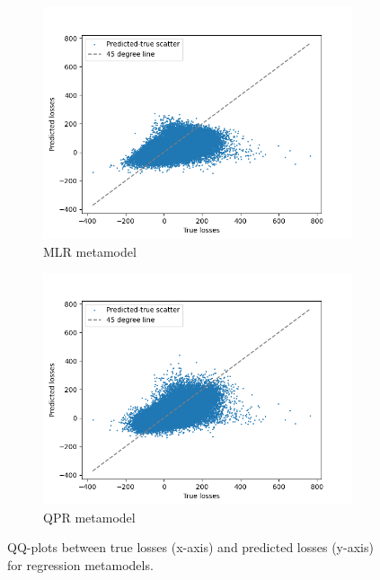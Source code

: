 \begin{figure}[ht!]
    \centering
    \begin{subfigure}{0.48\textwidth}
        \includegraphics[width=\textwidth]{./project2/figures/qqPlots/mlrLN.png}
        \caption{MLR metamodel}
    \end{subfigure}\hfill
    \begin{subfigure}{0.48\textwidth}
        \includegraphics[width=\textwidth]{./project2/figures/qqPlots/qprLN.png}
        \caption{QPR metamodel}
    \end{subfigure}
    \caption{QQ-plots between true losses (x-axis) and predicted losses (y-axis) for regression metamodels.} 
    \label{fig2:QQ_REG}
\end{figure}

